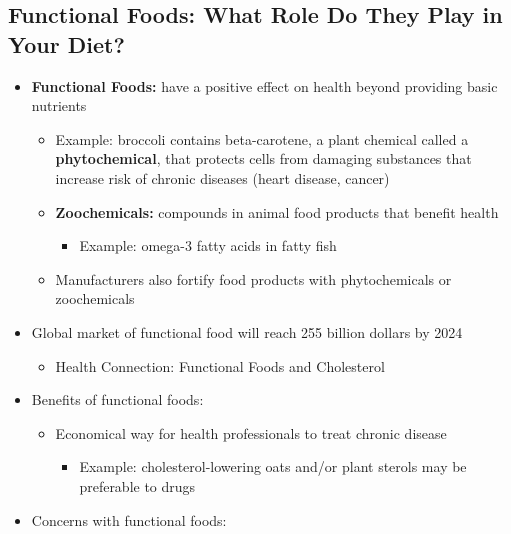\documentclass[12pt]{article}
\begin{document}
        \subsection{Functional Foods: What Role Do They Play in Your Diet?}
            \begin{itemize}
                \item \textbf{Functional Foods:} have a positive effect on health beyond providing basic nutrients
                    \begin{itemize}
                        \item Example: broccoli contains beta-carotene, a plant chemical called a \textbf{phytochemical}, that protects cells from damaging substances that increase risk of chronic diseases (heart disease, cancer)
                        \item \textbf{Zoochemicals:} compounds in animal food products that benefit health
                            \begin{itemize}
                                \item Example: omega-3 fatty acids in fatty fish
                            \end{itemize}
                        \item Manufacturers also fortify food products with phytochemicals or zoochemicals
                    \end{itemize}
                \item Global market of functional food will reach 255 billion dollars by 2024
                    \begin{itemize}
                        \item Health Connection: Functional Foods and Cholesterol
                    \end{itemize}
                \item Benefits of functional foods:
                    \begin{itemize}
                        \item Economical way for health professionals to treat chronic disease
                            \begin{itemize}
                                \item Example: cholesterol-lowering oats and/or plant sterols may be preferable to drugs
                            \end{itemize}
                    \end{itemize}
                \item Concerns with functional foods:

\end{itemize}
\end{document}
